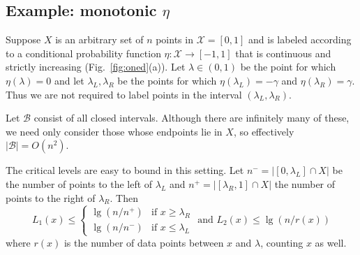 \documentclass[twoside]{article}
\def\X{{\mathcal X}}
\def\B{{\mathcal B}}
\begin{document}
\subsection{Example: monotonic $\eta$}

Suppose $X$ is an arbitrary set of $n$ points in $\X = [0,1]$ and is labeled according to a conditional probability function $\eta: \X \to [-1,1]$ that is continuous and strictly increasing (Fig.~\ref{fig:oned}(a)). Let $\lambda \in (0,1)$ be the point for which $\eta(\lambda) = 0$ and let $\lambda_L, \lambda_R$ be the points for which $\eta(\lambda_L) = -\gamma$ and $\eta(\lambda_R) = \gamma$. Thus we are not required to label points in the interval $(\lambda_L, \lambda_R)$. 






Let $\B$ consist of all closed intervals. Although there are infinitely many of these, we need only consider those whose endpoints lie in $X$, so effectively $|\B| = O(n^2)$.

The critical levels are easy to bound in this setting. Let $n^- = |[0,\lambda_L] \cap X|$  be the number of points to the left of $\lambda_L$ and $n^+ = |[\lambda_R,1] \cap X|$ the number of points to the right of $\lambda_R$. Then 
$$
L_1(x)
\leq
\left\{
\begin{array}{ll}
\lg (n/n^+) & \mbox{if $x \geq \lambda_R$} \\
\lg (n/n^-) & \mbox{if $x \leq \lambda_L$}
\end{array}
\right.
\mbox{\ \ \ \ and \ \ \ }
L_2(x)
\leq
\lg (n/r(x))
$$
where $r(x)$ is the number of data points between $x$ and $\lambda$, counting $x$ as well.
\end{document}
